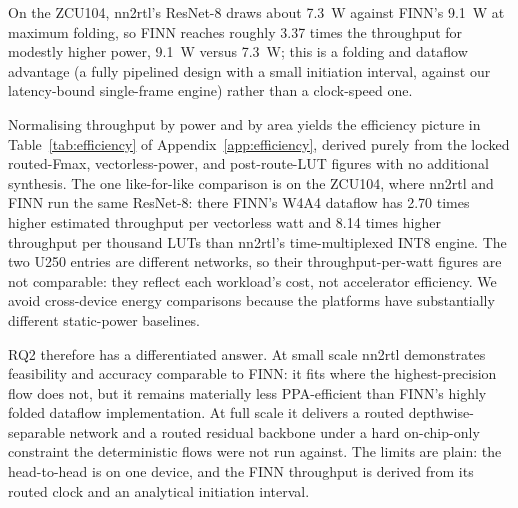 On the ZCU104, nn2rtl's ResNet-8 draws about 7.3~W against FINN's 9.1~W at maximum folding, so FINN reaches roughly 3.37 times the throughput for modestly higher power, 9.1~W versus 7.3~W; this is a folding and dataflow advantage (a fully pipelined design with a small initiation interval, against our latency-bound single-frame engine) rather than a clock-speed one.

Normalising throughput by power and by area yields the efficiency picture in Table~\ref{tab:efficiency} of Appendix~\ref{app:efficiency}, derived purely from the locked routed-Fmax, vectorless-power, and post-route-LUT figures with no additional synthesis. The one like-for-like comparison is on the ZCU104, where nn2rtl and FINN run the same ResNet-8: there FINN's W4A4 dataflow has 2.70 times higher estimated throughput per vectorless watt and 8.14 times higher throughput per thousand LUTs than nn2rtl's time-multiplexed INT8 engine. The two U250 entries are different networks, so their throughput-per-watt figures are not comparable: they reflect each workload's cost, not accelerator efficiency. We avoid cross-device energy comparisons because the platforms have substantially different static-power baselines.

RQ2 therefore has a differentiated answer. At small scale nn2rtl demonstrates feasibility and accuracy comparable to FINN: it fits where the highest-precision flow does not, but it remains materially less PPA-efficient than FINN's highly folded dataflow implementation. At full scale it delivers a routed depthwise-separable network and a routed residual backbone under a hard on-chip-only constraint the deterministic flows were not run against. The limits are plain: the head-to-head is on one device, and the FINN throughput is derived from its routed clock and an analytical initiation interval.
